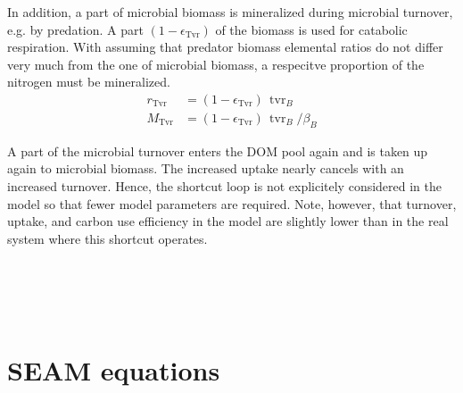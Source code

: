 In addition, a part of microbial biomass is mineralized during microbial
turnover, e.g. by predation. A part $(1-\epsilon_\operatorname{Tvr})$ of the
biomass is used for catabolic respiration. With assuming that predator biomass
elemental ratios do not differ very much from the one of microbial biomass, a
respecitve proportion of the nitrogen must be mineralized. 
\begin{subequations}
\label{eq:tvrB}
\begin{align}
r_\operatorname{Tvr} &= (1-\epsilon_{\operatorname{Tvr}}) \,
\operatorname{tvr}_B
\\
M_\operatorname{Tvr} &= (1-\epsilon_{\operatorname{Tvr}}) \,
\operatorname{tvr}_B / \beta_B
\end{align}
\end{subequations}

A part of the microbial turnover enters the DOM pool again and is taken up again
to microbial biomass. The increased uptake nearly cancels with an increased
turnover. Hence, the shortcut loop is not explicitely considered in the model
so that fewer model parameters are required.
Note, however, that turnover, uptake, and carbon use efficiency in the model
are slightly lower than in the real system where this shortcut operates. 


\section{\\ \\ \hspace*{-7mm}  SEAM equations \label{app:fAlphaFix}}    %


